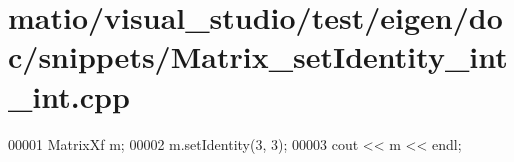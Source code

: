 \hypertarget{matio_2visual__studio_2test_2eigen_2doc_2snippets_2_matrix__set_identity__int__int_8cpp_source}{}\section{matio/visual\+\_\+studio/test/eigen/doc/snippets/\+Matrix\+\_\+set\+Identity\+\_\+int\+\_\+int.cpp}
\label{matio_2visual__studio_2test_2eigen_2doc_2snippets_2_matrix__set_identity__int__int_8cpp_source}

\begin{DoxyCode}
00001 MatrixXf m;
00002 m.setIdentity(3, 3);
00003 cout << m << endl;
\end{DoxyCode}

